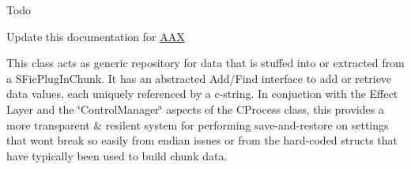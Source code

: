 \begin{DoxyRefDesc}{Todo}
\item[\mbox{\hyperlink{a00785__todo000012}{Todo}}]Update this documentation for \mbox{\hyperlink{a00852}{A\+AX}}\end{DoxyRefDesc}


This class acts as generic repository for data that is stuffed into or extracted from a S\+Fic\+Plug\+In\+Chunk. It has an abstracted Add/\+Find interface to add or retrieve data values, each uniquely referenced by a c-\/string. In conjuction with the Effect Layer and the \char`\"{}\+Control\+Manager\char`\"{} aspects of the C\+Process class, this provides a more transparent \& resilent system for performing save-\/and-\/restore on settings that won\textquotesingle{}t break so easily from endian issues or from the hard-\/coded structs that have typically been used to build chunk data.

